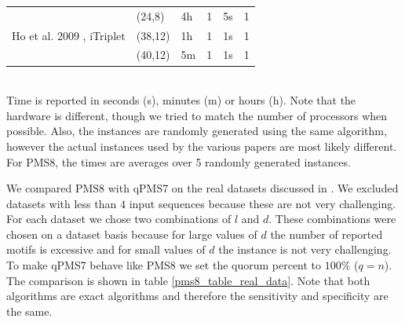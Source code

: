 \begin{table}
\begin{tabular}{| p{2.5in} | p{0.5in} | p{0.5in} | p{0.6in} | p{0.4in} | p{0.4in} |}
\hline
\multirow{3}{*}{Ho et al. 2009 \cite{HJG09}, iTriplet} & (24,8) & 4h & 1 & 5s & 1\\
\cline{2-6}
                                      & (38,12) & 1h & 1 & 1s & 1\\
\cline{2-6}
                                      & (40,12) & 5m & 1 & 1s & 1\\
\hline
\end{tabular}\\
 Time is reported in seconds (s), minutes (m) 
or hours (h). Note that the hardware is different, though we tried to match
the number of processors when possible. Also, the instances are randomly
generated using the same algorithm, however the actual instances used by the
various papers are most likely different. For PMS8, the times are averages
over 5 randomly generated instances.
\end{table}



We compared PMS8 with qPMS7 on the real datasets discussed in
\cite{TLB+05}. We excluded datasets with less than $4$ input
sequences because these are not very challenging. For each dataset we chose two
combinations of $l$ and $d$. These combinations were chosen on a dataset
basis because for large values of $d$ the number of reported motifs is
excessive and for small values of $d$ the instance is not very challenging.
To make qPMS7 behave like PMS8 we set the quorum percent to $100\%$ ($q=n$).
The comparison is shown in table \ref{pms8_table_real_data}. Note that both algorithms
are exact algorithms and therefore the sensitivity and specificity are the same.


